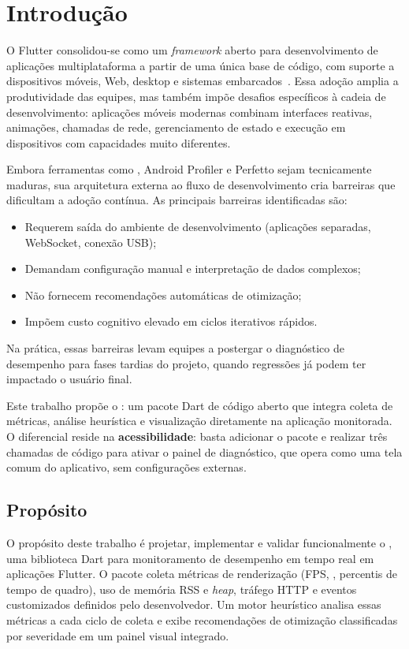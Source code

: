 \chapter{Introdução}



O Flutter consolidou-se como um \textit{framework} aberto para desenvolvimento de aplicações multiplataforma a partir de uma única base de código, com suporte a dispositivos móveis, Web, desktop e sistemas embarcados~\cite{flutter2026}. Essa adoção amplia a produtividade das equipes, mas também impõe desafios específicos à cadeia de desenvolvimento: aplicações móveis modernas combinam interfaces reativas, animações, chamadas de rede, gerenciamento de estado e execução em dispositivos com capacidades muito diferentes.


Embora ferramentas como \devtools, Android Profiler e Perfetto sejam tecnicamente maduras, sua arquitetura externa ao fluxo de desenvolvimento cria barreiras que dificultam a adoção contínua. As principais barreiras identificadas são:
\begin{itemize}
  \item Requerem saída do ambiente de desenvolvimento (aplicações separadas, WebSocket, conexão USB);
  \item Demandam configuração manual e interpretação de dados complexos;
  \item Não fornecem recomendações automáticas de otimização;
  \item Impõem custo cognitivo elevado em ciclos iterativos rápidos.
\end{itemize}
Na prática, essas barreiras levam equipes a postergar o diagnóstico de desempenho para fases tardias do projeto, quando regressões já podem ter impactado o usuário final.

Este trabalho propõe o \collectorFlutter: um pacote Dart de código aberto que integra coleta de métricas, análise heurística e visualização diretamente na aplicação monitorada. O diferencial reside na \textbf{acessibilidade}: basta adicionar o pacote e realizar três chamadas de código para ativar o painel de diagnóstico, que opera como uma tela comum do aplicativo, sem configurações externas.

\section{Propósito}


O propósito deste trabalho é projetar, implementar e validar funcionalmente o \collectorFlutter, uma biblioteca Dart para monitoramento de desempenho em tempo real em aplicações Flutter. O pacote coleta métricas de renderização (FPS, \jank, percentis de tempo de quadro), uso de memória RSS e \textit{heap}, tráfego HTTP e eventos customizados definidos pelo desenvolvedor. Um motor heurístico analisa essas métricas a cada ciclo de coleta e exibe recomendações de otimização classificadas por severidade em um painel visual integrado.


